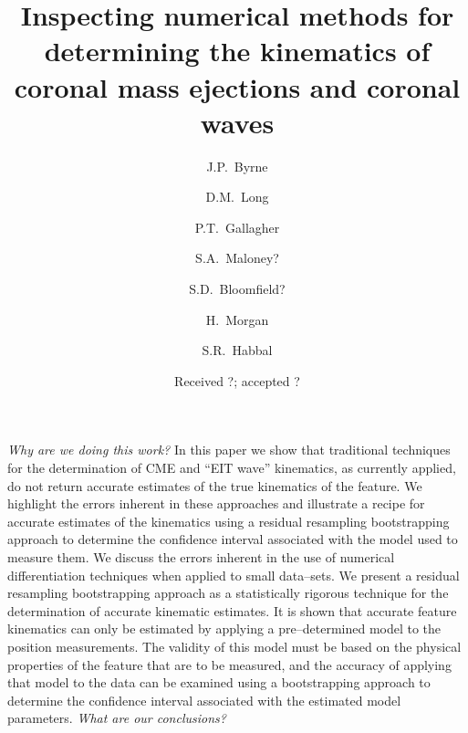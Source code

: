 \documentclass[structabstract]{aa}
\begin{document}
\title{Inspecting numerical methods for determining the kinematics of coronal mass ejections and coronal waves}


\author{J.P.~Byrne
	\and D.M.~Long
	\and P.T.~Gallagher
	\and S.A.~Maloney?
	\and S.D.~Bloomfield?
	\and H.~Morgan
	\and S.R.~Habbal}

\date{Received ?; accepted ?}
\abstract
{\emph{Why are we doing this work?} }
{In this paper we show that traditional techniques for the determination of CME and ``EIT wave'' kinematics, as currently applied, do not return accurate estimates of the true kinematics of the feature. We highlight the errors inherent in these approaches and illustrate a recipe for accurate estimates of the kinematics using a residual resampling bootstrapping approach to determine the confidence interval associated with the model used to measure them.}
{We discuss the errors inherent in the use of numerical differentiation techniques when applied to small data--sets. We present a residual resampling bootstrapping approach as a statistically rigorous technique for the determination of accurate kinematic estimates.}
{It is shown that accurate feature kinematics can only be estimated by applying a pre--determined model to the position measurements. The validity of this model must be based on the physical properties of the feature that are to be measured, and the accuracy of applying that model to the data can be examined using a bootstrapping approach to determine the confidence interval associated with the estimated model parameters.}
{\emph{What are our conclusions?}}


\end{document}
